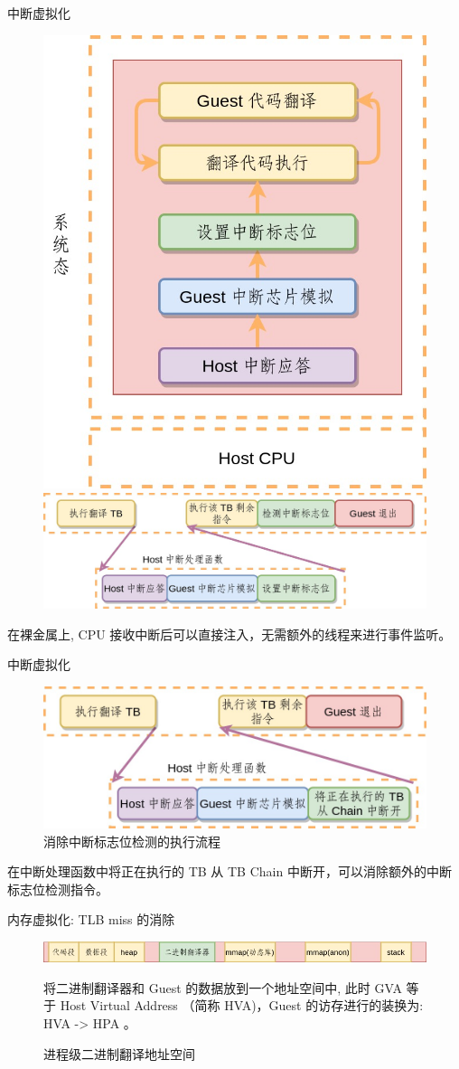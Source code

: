 \documentclass{beamer}
\begin{document}
\begin{frame}{中断虚拟化}
	\begin{figure}
		\includegraphics[width=0.35\linewidth]{../paper/images/bmbt-interrupt.jpg}
		\includegraphics[width=0.6\linewidth]{../paper/images/bmbt-interrupt-codeflow.jpg}
	\end{figure}
	在裸金属上, CPU 接收中断后可以直接注入，无需额外的线程来进行事件监听。
\end{frame}

\begin{frame}{中断虚拟化}
	\begin{figure}
		\includegraphics[width=0.7\linewidth]{../paper/images/bmbt-interrupt-codeflow2.jpg}
		\caption{消除中断标志位检测的执行流程}
	\end{figure}
	在中断处理函数中将正在执行的 TB 从 TB Chain 中断开，可以消除额外的中断标志位检测指令。
\end{frame}

\begin{frame}{内存虚拟化: TLB miss 的消除}
	\begin{figure}
		\includegraphics[width=\linewidth]{../paper/images/user-as2.jpg}
		\caption{进程级二进制翻译地址空间}
		将二进制翻译器和 Guest 的数据放到一个地址空间中, 此时 GVA 等于 Host Virtual Address （简称 HVA)，Guest 的访存进行的装换为: HVA -> HPA 。
	\end{figure}
\end{frame}
\end{document}
